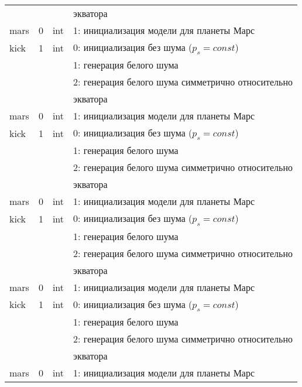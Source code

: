 \documentclass[14pt]{extreport}
\begin{document}
\begin{longtable}[c]{|l|c|l|l|}
  & & & экватора    \\
 mars & 0 & int & 1: инициализация модели для планеты Марс     \\
kick & 1 & int & 0: инициализация без шума ($p_s = const$) \\
      &   &     & 1: генерация белого шума                  \\
      &   &     & 2: генерация белого шума симметрично относительно \\
  & & & экватора    \\
 mars & 0 & int & 1: инициализация модели для планеты Марс     \\
kick & 1 & int & 0: инициализация без шума ($p_s = const$) \\
      &   &     & 1: генерация белого шума                  \\
      &   &     & 2: генерация белого шума симметрично относительно \\
  & & & экватора    \\
 mars & 0 & int & 1: инициализация модели для планеты Марс     \\
kick & 1 & int & 0: инициализация без шума ($p_s = const$) \\
      &   &     & 1: генерация белого шума                  \\
      &   &     & 2: генерация белого шума симметрично относительно \\
  & & & экватора    \\
 mars & 0 & int & 1: инициализация модели для планеты Марс     \\
kick & 1 & int & 0: инициализация без шума ($p_s = const$) \\
      &   &     & 1: генерация белого шума                  \\
      &   &     & 2: генерация белого шума симметрично относительно \\
  & & & экватора    \\
 mars & 0 & int & 1: инициализация модели для планеты Марс     \\ 
 \hline 
\end{longtable}
\end{document}
